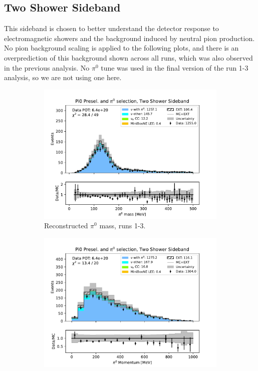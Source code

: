 \subsection{Two Shower Sideband}
\label{sec:TwoShowerSideband}

This sideband is chosen to better understand the detector response to electromagnetic showers and the background induced by neutral pion production. No pion background scaling is applied to the following plots, and there is an overprediction of this background shown across all runs, which was also observed in the previous analysis. No $\pi^0$ tune was used in the final version of the run 1-3 analysis, so we are not using one here. 

\begin{figure}[H]
    \centering
    \begin{subfigure}{0.33\linewidth}
        \includegraphics[width=\linewidth]{technote/Sidebands/Figures/TwoShowerSideband/two_shr_sideband_pi0_mass_Y_corr_run123_PI0_PI0.pdf}
        \caption{Reconstructed $\pi^0$ mass, runs 1-3.}
    \end{subfigure}%
    \begin{subfigure}{0.33\linewidth}
        \includegraphics[width=\linewidth]{technote/Sidebands/Figures/TwoShowerSideband/two_shr_sideband_pi0momentum_run123_PI0_PI0.pdf}

\end{subfigure}
\end{figure}
